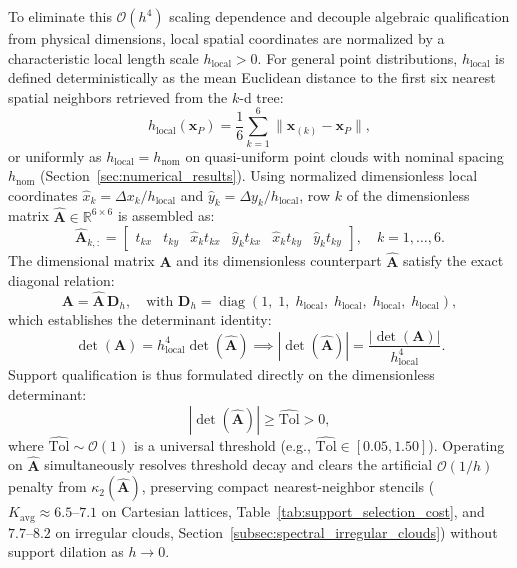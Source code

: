 \documentclass[preprint,12pt]{elsarticle}
\begin{document}
To eliminate this $\mathcal{O}(h^4)$ scaling dependence and decouple algebraic qualification from physical dimensions, local spatial coordinates are normalized by a characteristic local length scale $h_{\mathrm{local}} > 0$. For general point distributions, $h_{\mathrm{local}}$ is defined deterministically as the mean Euclidean distance to the first six nearest spatial neighbors retrieved from the $k$-d tree:
\begin{equation}
    h_{\mathrm{local}}(\mathbf{x}_P) = \frac{1}{6} \sum_{k=1}^6 \|\mathbf{x}_{(k)} - \mathbf{x}_P\|,
    \label{eq:h_local_canonical}
\end{equation}
or uniformly as $h_{\mathrm{local}} = h_{\mathrm{nom}}$ on quasi-uniform point clouds with nominal spacing $h_{\mathrm{nom}}$ (Section~\ref{sec:numerical_results}).
Using normalized dimensionless local coordinates $\hat{x}_k = \Delta x_k / h_{\mathrm{local}}$ and $\hat{y}_k = \Delta y_k / h_{\mathrm{local}}$, row $k$ of the dimensionless matrix $\widehat{\mathbf{A}} \in \mathbb{R}^{6 \times 6}$ is assembled as:
\begin{equation}
    \widehat{\mathbf{A}}_{k, :} = \begin{bmatrix} t_{kx} & t_{ky} & \hat{x}_k t_{kx} & \hat{y}_k t_{kx} & \hat{x}_k t_{ky} & \hat{y}_k t_{ky} \end{bmatrix}, \quad k = 1, \dots, 6.
    \label{eq:matrix_A_hat_definition}
\end{equation}
The dimensional matrix $\mathbf{A}$ and its dimensionless counterpart $\widehat{\mathbf{A}}$ satisfy the exact diagonal relation:
\begin{equation}
    \mathbf{A} = \widehat{\mathbf{A}} \, \mathbf{D}_h, \quad \text{with } \mathbf{D}_h = \operatorname{diag}(1, \; 1, \; h_{\mathrm{local}}, \; h_{\mathrm{local}}, \; h_{\mathrm{local}}, \; h_{\mathrm{local}}),
    \label{eq:matrix_factorization_Dh}
\end{equation}
which establishes the determinant identity:
\begin{equation}
    \det(\mathbf{A}) = h_{\mathrm{local}}^4 \det(\widehat{\mathbf{A}}) \implies |\det(\widehat{\mathbf{A}})| = \frac{|\det(\mathbf{A})|}{h_{\mathrm{local}}^4}.
    \label{eq:dimensionless_det_relation}
\end{equation}
Support qualification is thus formulated directly on the dimensionless determinant:
\begin{equation}
    |\det(\widehat{\mathbf{A}})| \ge \widehat{\mathrm{Tol}} > 0,
    \label{eq:dimensionless_threshold_criterion}
\end{equation}
where $\widehat{\mathrm{Tol}} \sim \mathcal{O}(1)$ is a universal threshold (e.g., $\widehat{\mathrm{Tol}} \in [0.05, 1.50]$). Operating on $\widehat{\mathbf{A}}$ simultaneously resolves threshold decay and clears the artificial $\mathcal{O}(1/h)$ penalty from $\kappa_2(\widehat{\mathbf{A}})$, preserving compact nearest-neighbor stencils ($K_{\mathrm{avg}} \approx 6.5\text{--}7.1$ on Cartesian lattices, Table~\ref{tab:support_selection_cost}, and $7.7\text{--}8.2$ on irregular clouds, Section~\ref{subsec:spectral_irregular_clouds}) without support dilation as $h \to 0$.
\end{document}
